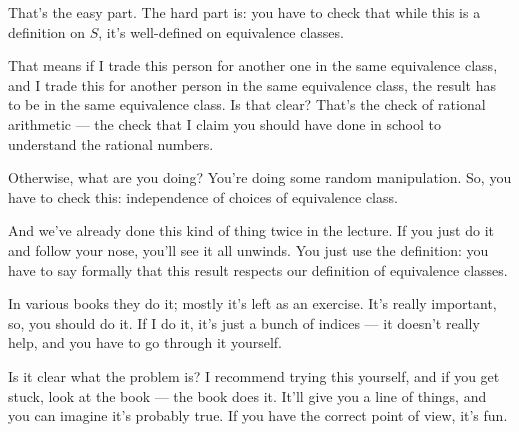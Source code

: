 \begin{speech}[01:00:01 - 01:02:20]
That's the easy part. The hard part is: you have to check that while this is a definition on $S$, it's well-defined on equivalence classes.

That means if I trade this person for another one in the same equivalence class, and I trade this for another person in the same equivalence class, the result has to be in the same equivalence class. Is that clear? That's the check of rational arithmetic --- the check that I claim you should have done in school to understand the rational numbers.

Otherwise, what are you doing? You're doing some random manipulation. So, you have to check this:  independence of choices of equivalence class.

And we've already done this kind of thing twice in the lecture. If you just do it and follow your nose, you'll see it all unwinds. You just use the definition: you have to say formally that this result respects our definition of equivalence classes.

In various books they do it; mostly it's left as an exercise. It's really important, so, you should do it. If I do it, it's just a bunch of indices --- it doesn't really help, and you have to go through it yourself.

Is it clear what the problem is? I recommend trying this yourself, and if you get stuck, look at the book --- the book does it. It'll give you a line of things, and you can imagine it's probably true. If you have the correct point of view, it's fun.
\end{speech}

